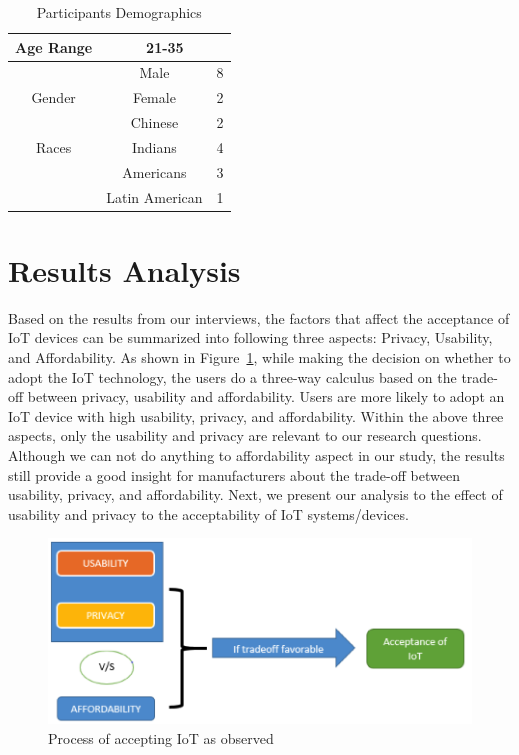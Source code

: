 \begin {table}
\caption {Participants Demographics} \label{tab:demographics1}
\begin{center}
	\begin{tabular}{c|c|c}
		\hline
		Age Range & \multicolumn{2}{c}{ 21-35 }\\
		\hline
		& Male & 8 \\
		\cline{2-3}
		Gender    & Female & 2 \\
		\hline
		& Chinese & 2 \\
		\cline{2-3}
		Races 	  & Indians & 4 \\
		\cline{2-3}
		& Americans & 3 \\
		\cline{2-3}
		& Latin American & 1\\
		\hline
	\end{tabular}
\end{center}
\end {table}


\section{Results Analysis}
Based on the results from our interviews, the factors that affect the acceptance of IoT devices can be summarized into following three aspects: Privacy, Usability, and Affordability. As shown in Figure~\ref{fig:AcceptingProcess}, while making the decision on whether to adopt the IoT technology, the users do a three-way calculus based on the trade-off between privacy, usability and affordability. Users are more likely to adopt an IoT device with high usability, privacy, and affordability. Within the above three aspects, only the usability and privacy  are relevant to our research questions. Although we can not do anything to affordability aspect in our study, the results still provide a good insight for manufacturers about the trade-off between usability, privacy, and affordability. Next, we present our analysis to the effect of usability and privacy to the acceptability of IoT systems/devices.

\begin{figure}[htb]
	\centering
	\includegraphics[width=0.6\columnwidth]{figures/AcceptingProcess.png}
	\caption{Process of accepting IoT as observed}
	\label{fig:AcceptingProcess}
\end{figure}

